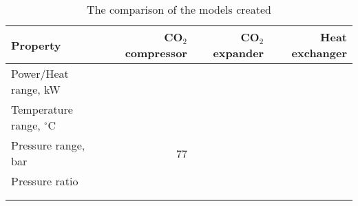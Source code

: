 \begin{table}
\label{tab:DiscussionComparison}
\caption{The comparison of the models created}
\begin{center}
\begin{tabulary}{0.9\textwidth}{LRRR}
\toprule
Property    	                &	CO$_2$ compressor   & CO$_2$	expander    & Heat exchanger    \\
\midrule
Power/Heat range, kW            &                       &                       &                   \\
Temperature range, $^\circ$C    &                       &                       &                   \\
Pressure range, bar             &   77                  &                       &                   \\
Pressure ratio                  &                       &                       &                   \\
& & & \\
& & & \\
\bottomrule
\end{tabulary}
\end{center}
\end{table}
